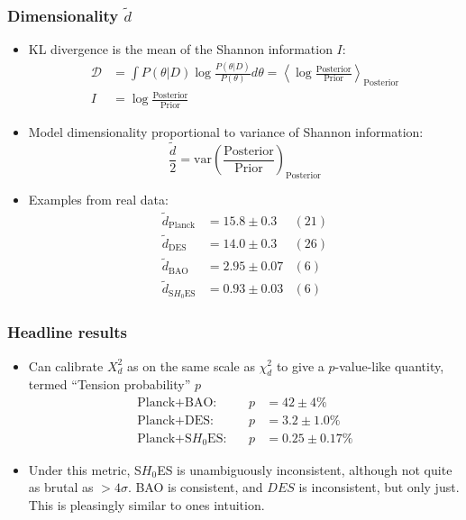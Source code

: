 \documentclass[%
]{beamer}
\begin{document}
\begin{frame}
    \frametitle{Dimensionality $\tilde{d}$}
    \begin{itemize}
        \item KL divergence is the mean of the Shannon information $I$:
            \begin{align}
                \mathcal{D} &= \int P(\theta|D) \log \frac{P(\theta|D)}{P(\theta)} d\theta = \left\langle\log\frac{\text{Posterior}}{\text{Prior}}\right\rangle_\text{Posterior}\nonumber\\
                I &= \log\frac{\text{Posterior}}{\text{Prior}}\nonumber
            \end{align}
        \item Model dimensionality proportional to variance of Shannon information:
            \[
                \frac{\tilde{d}}{2} = \text{var}\left(\frac{\text{Posterior}}{\text{Prior}}\right)_\text{Posterior}
            \]
        \item Examples from real data:
            \begin{align}
                \tilde{d}_\text{Planck} &= 15.8 \pm  0.3 &(21) \nonumber\\
                \tilde{d}_\text{DES} &= 14.0 \pm  0.3 &(26) \nonumber\\
                \tilde{d}_\text{BAO} &= 2.95 \pm  0.07 &(6) \nonumber\\
                \tilde{d}_\text{S$H_0$ES} &= 0.93 \pm  0.03 &(6) \nonumber
            \end{align}
    \end{itemize}

\end{frame}

\begin{frame}
    \frametitle{Headline results}
    \begin{itemize}
        \item Can calibrate $X^2_d$ as on the same scale as $\chi^2_d$ to give a $p$-value-like quantity, termed ``Tension probability'' $p$
            \begin{align}
                \text{Planck+BAO}:&      &p&=  42 \pm     4 \% \nonumber\\
                \text{Planck+DES}:&      &p&=   3.2 \pm     1.0 \% \nonumber\\
                \text{Planck+S$H_0$ES}:& &p&=   0.25 \pm     0.17 \% \nonumber
            \end{align}
        \item Under this metric, S$H_0$ES is unambiguously inconsistent, although not quite as brutal as $>4\sigma$. BAO is consistent, and $DES$ is inconsistent, but only just. This is pleasingly similar to ones intuition.
    \end{itemize}
\end{frame}
\end{document}
